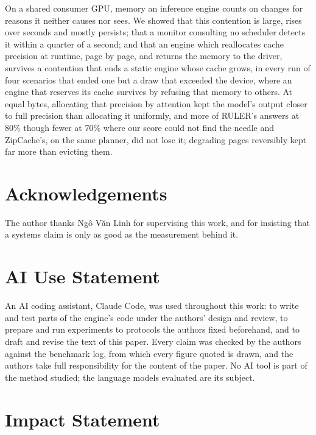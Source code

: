\documentclass{article}
\begin{document}
On a shared consumer GPU, memory an inference engine counts on changes for
reasons it neither causes nor sees. We showed that this contention is large,
rises over seconds and mostly persists; that a monitor consulting no scheduler
detects it within a quarter of a second; and that an engine which reallocates
cache precision at runtime, page by page, and returns the memory to the driver,
survives a contention that ends a static engine whose cache grows, in every run
of four scenarios that ended one but a draw that exceeded the device, where an
engine that reserves its cache survives by refusing that memory to others. At equal
bytes, allocating
that precision by attention kept the model's output closer to full precision
than allocating it uniformly, and more of RULER's answers at 80\% though fewer
at 70\% where our score could not find the needle and ZipCache's, on the same
planner, did not lose it; degrading pages reversibly kept far more than evicting
them.


\ificmlshowauthors
\section*{Acknowledgements}

The author thanks Ng\^o V\u{a}n Linh for supervising this work, and for
insisting that a systems claim is only as good as the measurement behind it.
\fi

\section*{AI Use Statement}

An AI coding assistant, Claude Code, was used throughout this work: to write
and test parts of the engine's code under the authors' design and review, to
prepare and run experiments to protocols the authors fixed beforehand, and to
draft and revise the text of this paper. Every claim was checked by the authors
against the benchmark log, from which every figure quoted is drawn, and the
authors take full responsibility for the content of the paper. No AI tool is
part of the method studied; the language models evaluated are its subject.

\section*{Impact Statement}
\end{document}
